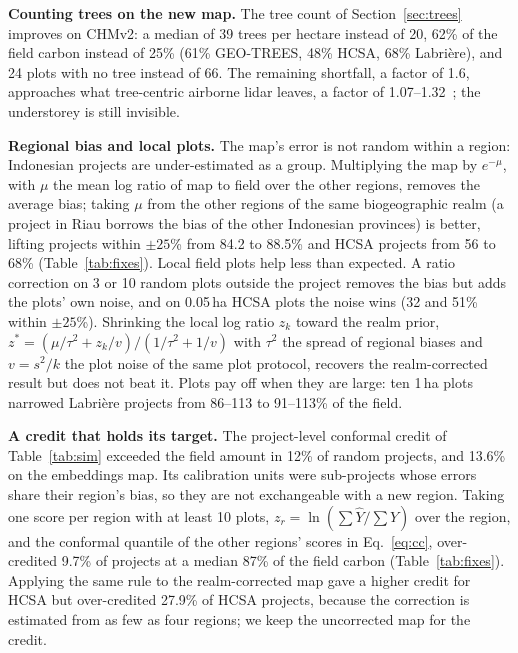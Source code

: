 \documentclass[conference,a4paper]{IEEEtran}
\begin{document}
\textbf{Counting trees on the new map.} The tree count of Section~\ref{sec:trees} improves on CHMv2: a median of 39 trees per hectare instead of 20, 62\% of the field carbon instead of 25\% (61\% GEO-TREES, 48\% HCSA, 68\% Labri\`ere), and 24 plots with no tree instead of 66. The remaining shortfall, a factor of 1.6, approaches what tree-centric airborne lidar leaves, a factor of 1.07--1.32~\cite{coomes2017area}; the understorey is still invisible.

\textbf{Regional bias and local plots.} The map's error is not random within a region: Indonesian projects are under-estimated as a group. Multiplying the map by $e^{-\mu}$, with $\mu$ the mean log ratio of map to field over the other regions, removes the average bias; taking $\mu$ from the other regions of the same biogeographic realm (a project in Riau borrows the bias of the other Indonesian provinces) is better, lifting projects within $\pm25$\% from 84.2 to 88.5\% and HCSA projects from 56 to 68\% (Table~\ref{tab:fixes}). Local field plots help less than expected. A ratio correction on 3 or 10 random plots outside the project removes the bias but adds the plots' own noise, and on 0.05\,ha HCSA plots the noise wins (32 and 51\% within $\pm25$\%). Shrinking the local log ratio $z_k$ toward the realm prior, $z^*=(\mu/\tau^2+z_k/v)/(1/\tau^2+1/v)$ with $\tau^2$ the spread of regional biases and $v=s^2/k$ the plot noise of the same plot protocol, recovers the realm-corrected result but does not beat it. Plots pay off when they are large: ten 1\,ha plots narrowed Labri\`ere projects from 86--113 to 91--113\% of the field.

\textbf{A credit that holds its target.} The project-level conformal credit of Table~\ref{tab:sim} exceeded the field amount in 12\% of random projects, and 13.6\% on the embeddings map. Its calibration units were sub-projects whose errors share their region's bias, so they are not exchangeable with a new region. Taking one score per region with at least 10 plots, $z_r=\ln(\sum\hat Y/\sum Y)$ over the region, and the conformal quantile of the other regions' scores in Eq.~\ref{eq:cc}, over-credited 9.7\% of projects at a median 87\% of the field carbon (Table~\ref{tab:fixes}). Applying the same rule to the realm-corrected map gave a higher credit for HCSA but over-credited 27.9\% of HCSA projects, because the correction is estimated from as few as four regions; we keep the uncorrected map for the credit.
\end{document}

